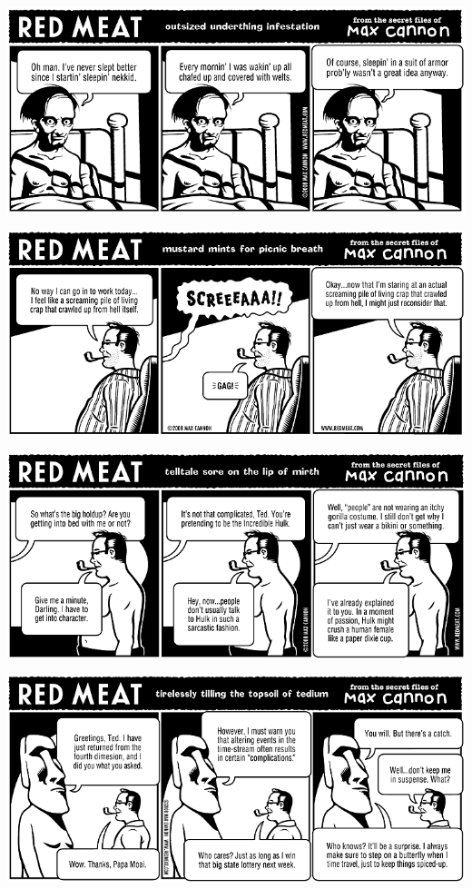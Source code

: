 \documentclass[a4paper,twoside,11pt]{article}
\begin{document}
\includegraphics[width=\textwidth]{redmeat_2008-03-11.png}



\includegraphics[width=\textwidth]{redmeat_2008-03-18.png}



\includegraphics[width=\textwidth]{redmeat_2008-03-25.png}



\includegraphics[width=\textwidth]{redmeat_2008-04-01.png}
\end{document}
